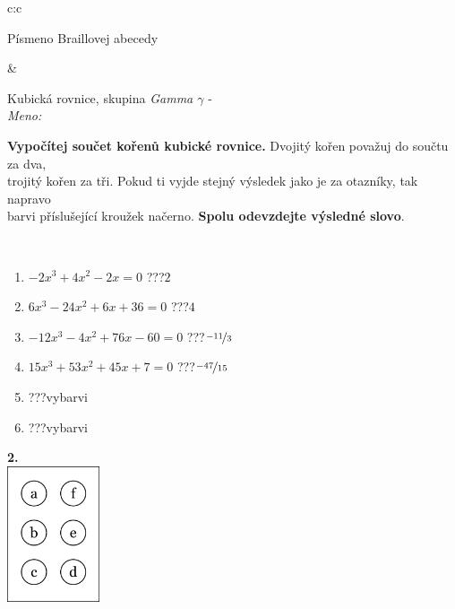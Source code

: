 \documentclass[10pt]{report}
\begin{document}
\begin{tabular}{c:c}
\begin{minipage}[c][104.5mm][t]{0.5\linewidth}
\begin{center}
\begin{minipage}{0.20\linewidth}
\begin{center}
{\small Písmeno Braillovej abecedy}
\end{center}
\end{minipage}
\end{center}
\end{minipage}
&
\begin{minipage}[c][104.5mm][t]{0.5\linewidth}
\begin{center}
\vspace{7mm}
{\huge Kubická rovnice, skupina \textit{Gamma $\gamma$} -}\\[5mm]
\textit{Meno:}\phantom{xxxxxxxxxxxxxxxxxxxxxxxxxxxxxxxxxxxxxxxxxxxxxxxxxxxxxxxxxxxxxxxxx}\\[5mm]
\begin{minipage}{0.95\linewidth}
\textbf{Vypočítej součet kořenů kubické rovnice.} Dvojitý kořen považuj do součtu za dva,\\trojitý kořen za tři. Pokud ti vyjde stejný výsledek jako je za otazníky, tak napravo\\barvi příslušející kroužek načerno. \textbf{Spolu odevzdejte výsledné slovo}.
\end{minipage}
\\[1mm]
\begin{minipage}{0.79\linewidth}
\begin{center}
\begin{varwidth}{\linewidth}
\begin{enumerate}
\Large
\item $-2x^3+4x^2-2x=0$\quad \dotfill\; ???\;\dotfill \quad $2$
\item $6x^3-24x^2+6x+36=0$\quad \dotfill\; ???\;\dotfill \quad $4$
\item $-12x^3-4x^2+76x-60=0$\quad \dotfill\; ???\;\dotfill \quad $\nicefrac{-11}{3}$
\item $15x^3+53x^2+45x+7=0$\quad \dotfill\; ???\;\dotfill \quad $\nicefrac{-47}{15}$
\item \quad \dotfill\; ???\;\dotfill \quad vybarvi
\item \quad \dotfill\; ???\;\dotfill \quad vybarvi
\end{enumerate}
\end{varwidth}
\end{center}
\end{minipage}
\begin{minipage}{0.20\linewidth}
\begin{center}
{\Huge\bfseries 2.} \\[2mm]
\includegraphics[height=40mm]{../images/braille.png}

\end{center}
\end{minipage}
\end{center}
\end{minipage}
\end{tabular}
\end{document}
